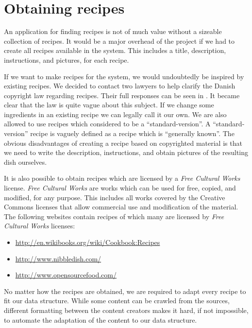 \section{Obtaining recipes}
An application for finding recipes is not of much value without a sizeable collection of recipes. It would be a major overhead of the project if we had to create all recipes available in the system. This includes a title, description, instructions, and pictures, for each recipe.

If we want to make recipes for the system, we would undoubtedly be inspired by existing recipes. We decided to contact two lawyers to help clarify the Danish copyright law regarding recipes. Their full responses can be seen in . It became clear that the law is quite vague about this subject. If we change some ingredients in an existing recipe we can legally call it our own. We are also allowed to use recipes which considered to be a ``standard-version''. A ``standard-version'' recipe is vaguely defined as a recipe which is ``generally known''. The obvious disadvantages of creating a recipe based on copyrighted material is that we need to write the description, instructions, and obtain pictures of the resulting dish ourselves.

It is also possible to obtain recipes which are licensed by a \emph{Free Cultural Works}\cite{freedomdefined} license. \emph{Free Cultural Works} are works which can be used for free, copied, and modified, for any purpose. This includes all works covered by the Creative Commons\cite{creativecommons} licenses that allow commercial use and modification of the material. The following websites contain recipes of which many are licensed by \emph{Free Cultural Works} licenses:
\begin{itemize}
	\item \url{http://en.wikibooks.org/wiki/Cookbook:Recipes}
	\item \url{http://www.nibbledish.com/}
	\item \url{http://www.opensourcefood.com/}
\end{itemize}

No matter how the recipes are obtained, we are required to adapt every recipe to fit our data structure. While some content can be crawled from the sources, different formatting between the content creators makes it hard, if not impossible, to automate the adaptation of the content to our data structure.